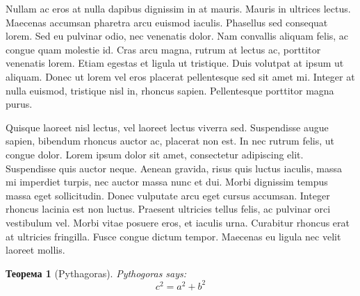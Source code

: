 \documentclass[notitlepage]{article}
\newtheorem{theorem}{Теорема}
\begin{document}
Nullam ac eros at nulla dapibus dignissim in at mauris. Mauris in ultrices lectus. Maecenas accumsan pharetra arcu euismod iaculis. Phasellus sed consequat lorem. Sed eu pulvinar odio, nec venenatis dolor. Nam convallis aliquam felis, ac congue quam molestie id. Cras arcu magna, rutrum at lectus ac, porttitor venenatis lorem. Etiam egestas et ligula ut tristique. Duis volutpat at ipsum ut aliquam. Donec ut lorem vel eros placerat pellentesque sed sit amet mi. Integer at nulla euismod, tristique nisl in, rhoncus sapien. Pellentesque porttitor magna purus.

Quisque laoreet nisl lectus, vel laoreet lectus viverra sed. Suspendisse augue sapien, bibendum rhoncus auctor ac, placerat non est. In nec rutrum felis, ut congue dolor. Lorem ipsum dolor sit amet, consectetur adipiscing elit. Suspendisse quis auctor neque. Aenean gravida, risus quis luctus iaculis, massa mi imperdiet turpis, nec auctor massa nunc et dui. Morbi dignissim tempus massa eget sollicitudin. Donec vulputate arcu eget cursus accumsan. Integer rhoncus lacinia est non luctus. Praesent ultricies tellus felis, ac pulvinar orci vestibulum vel. Morbi vitae posuere eros, et iaculis urna. Curabitur rhoncus erat at ultricies fringilla. Fusce congue dictum tempor. Maecenas eu ligula nec velit laoreet mollis. 
        \begin{theorem}[Pythagoras]\label{thm:Pyth}
            Pythogoras says:
            $$
                c^2 = a^2 + b^2
            $$
        \end{theorem}
\end{document}
